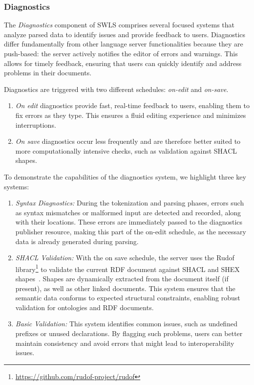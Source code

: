 \subsubsection{Diagnostics}

The \textit{Diagnostics} component of SWLS comprises several focused systems that analyze parsed data to identify issues and provide feedback to users.
Diagnostics differ fundamentally from other language server functionalities because they are push-based: the server actively notifies the editor of errors and warnings.
This allows for timely feedback, ensuring that users can quickly identify and address problems in their documents.

Diagnostics are triggered with two different schedules: \textit{on-edit} and \textit{on-save}.

\begin{enumerate}
  \item \textit{On edit} diagnostics provide fast, real-time feedback to users, enabling them to fix errors as they type. 
    This ensures a fluid editing experience and minimizes interruptions.
  \item \textit{On save} diagnostics occur less frequently and are therefore better suited to more computationally intensive checks,
   such as validation against SHACL shapes.
\end{enumerate}

To demonstrate the capabilities of the diagnostics system, we highlight three key systems:

\begin{enumerate}
  \item \textit{Syntax Diagnostics:}
    During the tokenization and parsing phases, errors such as syntax mismatches or malformed input are detected and recorded, along with their locations.
    These errors are immediately passed to the diagnostics publisher resource, making this part of the on-edit schedule, as the necessary data is already generated during parsing.
  \item \textit{SHACL Validation:} 
    With the on save schedule, the server uses the Rudof library\footnote{\url{https://github.com/rudof-project/rudof}} to validate the current RDF document against SHACL and SHEX shapes~\cite{labra2022rudof}.
    Shapes are dynamically extracted from the document itself (if present), as well as other linked documents.
    This system ensures that the semantic data conforms to expected structural constraints, enabling robust validation for ontologies and RDF documents.
  \item \textit{Basic Validation:}
    This system identifies common issues, such as undefined prefixes or unused declarations.
    By flagging such problems, users can better maintain consistency and avoid errors that might lead to interoperability issues.
\end{enumerate}

